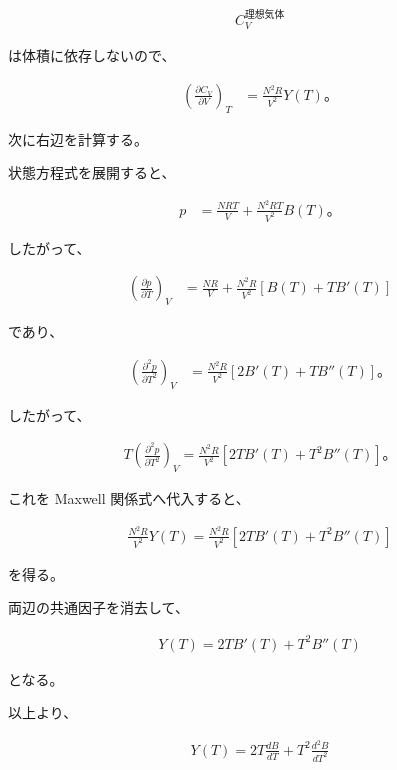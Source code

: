 \documentclass[platex,dvipdfmx,a4paper]{jsarticle}
\begin{document}
\begin{align*}
C_V^{\mathrm{理想気体}}
\end{align*}

は体積に依存しないので、

\begin{align*}
\left(
\frac{\partial C_V}{\partial V}
\right)_T
&=
\frac{N^2R}{V^2}Y(T)。
\end{align*}

次に右辺を計算する。

状態方程式を展開すると、

\begin{align*}
p
&=
\frac{NRT}{V}
+
\frac{N^2RT}{V^2}B(T)。
\end{align*}

したがって、

\begin{align*}
\left(
\frac{\partial p}{\partial T}
\right)_V
&=
\frac{NR}{V}
+
\frac{N^2R}{V^2}
\left[
B(T)+T B'(T)
\right]
\end{align*}

であり、

\begin{align*}
\left(
\frac{\partial^2p}{\partial T^2}
\right)_V
&=
\frac{N^2R}{V^2}
\left[
2B'(T)
+
TB''(T)
\right]。
\end{align*}

したがって、

\begin{align*}
T
\left(
\frac{\partial^2p}{\partial T^2}
\right)_V
=
\frac{N^2R}{V^2}
\left[
2T B'(T)
+
T^2 B''(T)
\right]。
\end{align*}

これを Maxwell 関係式へ代入すると、

\begin{align*}
\frac{N^2R}{V^2}Y(T)
=
\frac{N^2R}{V^2}
\left[
2TB'(T)
+
T^2B''(T)
\right]
\end{align*}

を得る。

両辺の共通因子を消去して、

\begin{align*}
Y(T)
=
2TB'(T)
+
T^2B''(T)
\end{align*}

となる。

以上より、

\begin{align*}
Y(T)
=
2T\frac{dB}{dT}
+
T^2\frac{d^2B}{dT^2}
\end{align*}
\end{document}
